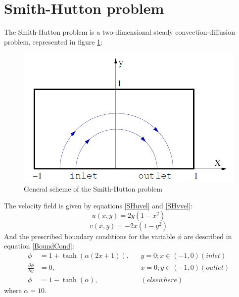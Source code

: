 \section{Smith-Hutton problem}
The Smith-Hutton problem is a two-dimensional steady convection-diffusion problem, represented in figure \ref{SHscheme}:
\begin{figure}
	\includegraphics[scale=0.8]{SmithHutton/SmithHutton}
	\caption{General scheme of the Smith-Hutton problem}
	\label{SHscheme}
\end{figure}
The velocity field is given by equations \ref{SHuvel} and \ref{SHvvel}:
\begin{equation}
u\left(x,y\right)=2y\left(1-x^{2}\right)
\label{SHuvel}
\end{equation}
\begin{equation}
v\left(x,y\right)=-2x\left(1-y^{2}\right)
\label{SHvvel}
\end{equation}
And the prescribed boundary conditions for the variable $\phi$ are described in equation \ref{BoundCond}:
\begin{equation}
\begin{aligned}
\phi &=1+\tanh\left(\alpha\left(2x+1\right)\right),&&y=0; x\in\left(-1,0\right) \left(inlet\right) \\
\frac{\partial\phi}{\partial y} &=0,&&x=0; y\in\left(-1,0\right) \left(outlet\right) \\
\phi &=1-\tanh\left(\alpha\right),&&\left(elsewhere\right)
\end{aligned}
\label{BoundCond}
\end{equation}
where $\alpha=10$.

